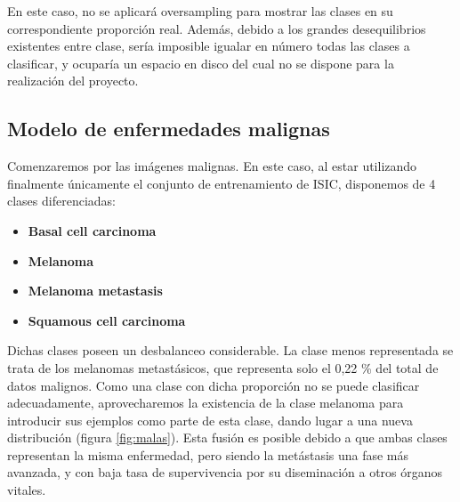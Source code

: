 En este caso, no se aplicará oversampling para mostrar las clases en su correspondiente proporción real.  Además, debido a los grandes desequilibrios existentes entre clase, sería imposible igualar en número todas las clases a clasificar, y ocuparía un espacio en disco del cual no se dispone para la realización del proyecto.

\subsection{Modelo de enfermedades malignas}

Comenzaremos por las imágenes malignas. En este caso, al estar utilizando finalmente únicamente el conjunto de entrenamiento de ISIC, disponemos de 4 clases diferenciadas:

\begin{itemize}
	\item \textbf{Basal cell carcinoma}
	\item \textbf{Melanoma}
	\item \textbf{Melanoma metastasis}
	\item \textbf{Squamous cell carcinoma}
	
\end{itemize}

Dichas clases poseen un desbalanceo considerable. La clase menos representada se trata de los melanomas metastásicos, que representa solo el 0,22 \% del total de datos malignos. Como una clase con dicha proporción no se puede clasificar adecuadamente, aprovecharemos la existencia de la clase melanoma para introducir sus ejemplos como parte de esta clase, dando lugar a una nueva distribución (figura \ref{fig:malas}). Esta fusión es posible debido a que ambas clases representan la misma enfermedad, pero siendo la metástasis una fase más avanzada, y con baja tasa de supervivencia por su diseminación a otros órganos vitales.

